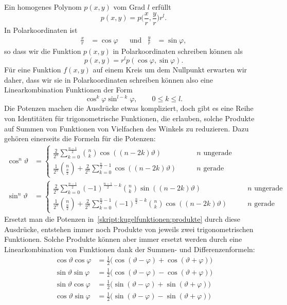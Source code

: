 Ein homogenes Polynom $p(x,y)$ vom Grad $l$ erfüllt
\[
p(x,y) = p\biggl(\frac{x}{r},\frac{y}{r}\biggr) r^l.
\]
In Polarkoordinaten ist
\[
\begin{aligned}
\frac{x}{r}&=\cos\varphi
&&\text{und}&
\frac{y}{r}&=\sin\varphi,
\end{aligned}
\]
so dass wir die Funktion $p(x,y)$ in Polarkoordinaten schreiben
können als
\[
p(x,y)=r^l p(\cos\varphi,\sin\varphi).
\]
Für eine Funktion $f(x,y)$ auf einem Kreis um dem Nullpunkt erwarten wir
daher, dass wir sie in Polarkoordinaten schreiben können also eine
Linearkombination Funktionen der Form
\begin{equation}
\cos^k\varphi \sin^{l-k}\varphi,\qquad 0\le k\le l.
\label{skript:kugelfunktionen:produkte}
\end{equation}
Die Potenzen machen die Ausdrücke etwas kompliziert, doch gibt
es eine Reihe von Identitäten für trigonometrische Funktionen,
die erlauben, solche Produkte auf Summen von Funktionen von 
Vielfachen des Winkels zu reduzieren.
Dazu gehören einerseits die Formeln für die Potenzen:
\begin{align*}
\cos^n\vartheta
&=
\begin{cases}
\displaystyle
\frac{2}{2^n}\sum_{k=0}^{\frac{n-1}2} \binom{n}{k}\cos((n-2k)\vartheta)
&\qquad\text{$n$ ungerade}
\\[10pt]
\displaystyle
\frac{1}{2^n}\binom{n}{\frac{n}2}
+
\frac{2}{2^n}\sum_{k=0}^{\frac{n}2-1}\cos((n-2k)\vartheta)
&\qquad\text{$n$ gerade}
\end{cases}
\\
\sin^n\vartheta
&=
\begin{cases}
\displaystyle
\frac{2}{2^n}\sum_{k=0}^{\frac{n-1}2} (-1)^{\frac{n-1}2-k}\binom{n}{k}\sin((n-2k)\vartheta)
&\qquad\text{$n$ ungerade}
\\[10pt]
\displaystyle
\frac{1}{2^n}\binom{n}{\frac{n}2}
+
\frac{2}{2^n}\sum_{k=0}^{\frac{n}2-1}(-1)^{\frac{n}2-k}\binom{n}{k}\cos((n-2k)\vartheta)
&\qquad\text{$n$ gerade}
\end{cases}
\end{align*}
Ersetzt man die Potenzen in~\eqref{skript:kugelfunktionen:produkte}
durch diese Ausdrücke, entstehen immer noch Produkte von jeweils
zwei trigonometrischen Funktionen.
Solche Produkte können aber immer ersetzt werden durch eine
Linearkombination von Funktionen dank der Summen- und Differenzenformeln:
\begin{align*}
\cos\vartheta\cos\varphi
&=
\frac12\bigl(\cos(\vartheta-\varphi)+\cos(\vartheta+\varphi)\bigr)
\\
\sin\vartheta\sin\varphi
&=
\frac12\bigl(\cos(\vartheta-\varphi)-\cos(\vartheta+\varphi)\bigr)
\\
\sin\vartheta\cos\varphi
&=
\frac12\bigl(\sin(\vartheta-\varphi)+\sin(\vartheta+\varphi)\bigr)
\\
\cos\vartheta\sin\varphi
&=
\frac12\bigl(\sin(\vartheta-\varphi)-\sin(\vartheta+\varphi)\bigr)
\end{align*}
